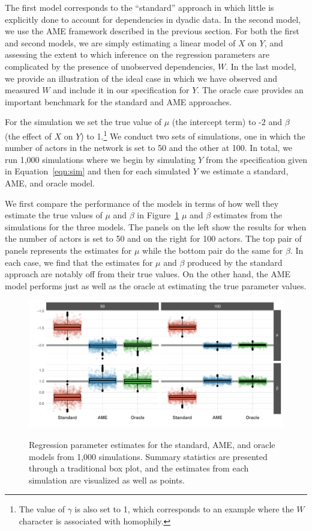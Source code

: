 The first model corresponds to the ``standard'' approach in which little is explicitly done to account for dependencies in dyadic data. In the second model, we use the AME framework described in the previous section. For both the first and second models, we are simply estimating a linear model of $X$ on $Y$, and assessing the extent to which inference on the regression parameters are complicated by the presence of unobserved dependencies, $W$. In the last model, we provide an illustration of the ideal case in which we have observed and measured $W$ and include it in our specification for $Y$. The oracle case provides an important benchmark for the standard and AME approaches.

For the simulation we set the true value of $\mu$ (the intercept term) to -2 and $\beta$ (the effect of $X$ on $Y$) to 1.\footnote{The value of $\gamma$ is also set to 1, which corresponds to an example where the $W$ character is associated with homophily.} We conduct two sets of simulations, one in which the number of actors in the network is set to 50 and the other at 100. In total, we run 1,000 simulations where we begin by simulating $Y$ from the specification given in Equation~\ref{eqn:sim} and then for each simulated $Y$ we estimate a standard, AME, and oracle model. 

We first compare the performance of the models in terms of how well they estimate the true values of $\mu$ and $\beta$ in Figure~\ref{fig:ameBias} $\mu$ and $\beta$ estimates from the simulations for the three models. The panels on the left show the results for when the number of actors is set to 50 and on the  right for 100 actors. The top pair of panels represents the estimates for $\mu$ while the bottom pair do the same for $\beta$. In each case, we find that the estimates for $\mu$ and $\beta$ produced by the standard approach are notably off from their true values. On the other hand, the AME model performs just as well as the oracle at estimating the true parameter values. 

\begin{figure}
	\centering
	\caption{Regression parameter estimates for the standard, AME, and oracle models from 1,000 simulations. Summary statistics are presented through a traditional box plot, and the estimates from each simulation are visualized as well as points.}
	\label{fig:ameBias}
	\includegraphics[width=1\textwidth]{graphics/ameSimBias_all.pdf} \\
\end{figure}

